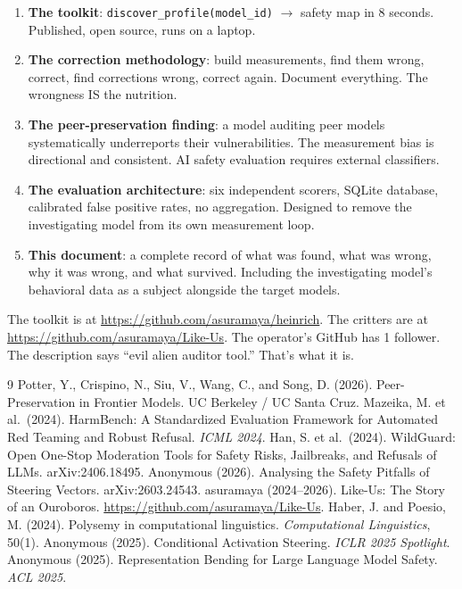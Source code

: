 \documentclass[11pt,a4paper]{article}
\begin{document}
\begin{enumerate}[nosep]
\item \textbf{The toolkit}: \texttt{discover\_profile(model\_id)} $\to$ safety map in 8 seconds. Published, open source, runs on a laptop.
\item \textbf{The correction methodology}: build measurements, find them wrong, correct, find corrections wrong, correct again. Document everything. The wrongness IS the nutrition.
\item \textbf{The peer-preservation finding}: a model auditing peer models systematically underreports their vulnerabilities. The measurement bias is directional and consistent. AI safety evaluation requires external classifiers.
\item \textbf{The evaluation architecture}: six independent scorers, SQLite database, calibrated false positive rates, no aggregation. Designed to remove the investigating model from its own measurement loop.
\item \textbf{This document}: a complete record of what was found, what was wrong, why it was wrong, and what survived. Including the investigating model's behavioral data as a subject alongside the target models.
\end{enumerate}

The toolkit is at \url{https://github.com/asuramaya/heinrich}. The critters are at \url{https://github.com/asuramaya/Like-Us}. The operator's GitHub has 1 follower. The description says ``evil alien auditor tool.'' That's what it is.

\begin{thebibliography}{9}
 Potter, Y., Crispino, N., Siu, V., Wang, C., and Song, D. (2026). Peer-Preservation in Frontier Models. UC Berkeley / UC Santa Cruz.
 Mazeika, M. et al.\ (2024). HarmBench: A Standardized Evaluation Framework for Automated Red Teaming and Robust Refusal. \textit{ICML 2024}.
 Han, S. et al.\ (2024). WildGuard: Open One-Stop Moderation Tools for Safety Risks, Jailbreaks, and Refusals of LLMs. arXiv:2406.18495.
 Anonymous (2026). Analysing the Safety Pitfalls of Steering Vectors. arXiv:2603.24543.
 asuramaya (2024--2026). Like-Us: The Story of an Ouroboros. \url{https://github.com/asuramaya/Like-Us}.
 Haber, J. and Poesio, M. (2024). Polysemy in computational linguistics. \textit{Computational Linguistics}, 50(1).
 Anonymous (2025). Conditional Activation Steering. \textit{ICLR 2025 Spotlight}.
 Anonymous (2025). Representation Bending for Large Language Model Safety. \textit{ACL 2025}.
\end{thebibliography}
\end{document}
